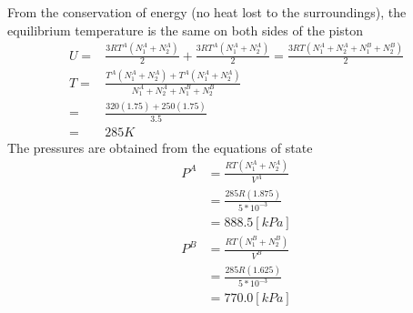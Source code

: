 \documentclass{article}
\numberwithin{equation}{section}
\begin{document}
From the conservation of energy (no heat lost to the surroundings), the equilibrium temperature is the same on both sides of the piston
\begin{align*}
U=&\frac{3RT^A(N_1^A+N_2^A)}{2}+\frac{3RT^A(N_1^A+N_2^A)}{2}=\frac{3RT(N_1^A+N_2^A+N_1^B+N_2^B)}{2}\\
T=&\frac{T^A(N_1^A+N_2^A)+T^A(N_1^A+N_2^A)}{N_1^A+N_2^A+N_1^B+N_2^B}\\
=&\frac{320(1.75)+250(1.75)}{3.5}\\
=&285K
\end{align*}
The pressures are obtained from the equations of state
\begin{align*}
P^A&=\frac{RT(N_1^A+N_2^A)}{V^A}\\
&=\frac{285R(1.875)}{5*10^{-3}}\\
&=888.5[kPa]\\
P^B&=\frac{RT(N_1^B+N_2^B)}{V^B}\\
&=\frac{285R(1.625)}{5*10^{-3}}\\
&=770.0[kPa]
\end{align*}


\begin{comment}
\begin{align*}
\frac{3P_AV_A}{2}=U_A
\end{align*}
Substituting the previous expression and setting $\frac{\partial S}{\partial N_1^i}=0$
\begin{align*}
0=&C+R\ln\frac{V^A(\frac{3P^AV^A}{2})^{\frac{3}{2}}}{(N_1^A+N_2^A)^{\frac{5}{2}}}-R\ln\frac{N_1^A}{N_1^A+N_2^A}-\frac{5}{2}R\\
0=&C+R\ln\frac{V^B(\frac{3P^BV^B}{2})^{\frac{3}{2}}}{(N_1^B+N_2^B)^{\frac{5}{2}}}-R\ln\frac{N_1^B}{N_1^B+N_2^B}-\frac{5}{2}R\\
\end{align*}
Using $N=N_1^A+N_2^A+N_1^B+N_2^B$ and $P^A=P^B$ and $V^A=V^B$ 
\begin{align*}
R\ln\frac{V^A(\frac{3P^AV^A}{2})^{\frac{3}{2}}}{(N_1^A+N_2^A)^{\frac{5}{2}}}-R\ln\frac{N_1^A}{N_1^A+N_2^A}=R\ln\frac{V^B(\frac{3P^BV^B}{2})^{\frac{3}{2}}}{(N_1^B+N_2^B)^{\frac{5}{2}}}-R\ln\frac{N_1^B}{N_1^B+N_2^B}\\
\end{align*}
\end{comment}
\end{document}
